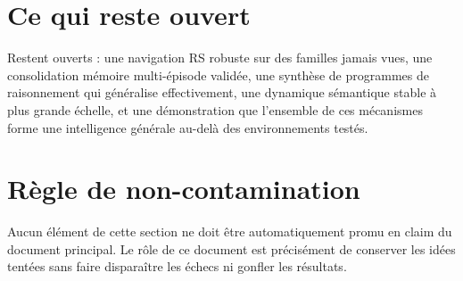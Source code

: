 \documentclass[11pt,a4paper]{article}
\begin{document}
\section{Ce qui reste ouvert}
Restent ouverts : une navigation RS robuste sur des familles jamais vues, une consolidation mémoire multi-épisode validée, une synthèse de programmes de raisonnement qui généralise effectivement, une dynamique sémantique stable à plus grande échelle, et une démonstration que l’ensemble de ces mécanismes forme une intelligence générale au-delà des environnements testés.

\section{Règle de non-contamination}
Aucun élément de cette section ne doit être automatiquement promu en claim du document principal. Le rôle de ce document est précisément de conserver les idées tentées sans faire disparaître les échecs ni gonfler les résultats.
\end{document}
